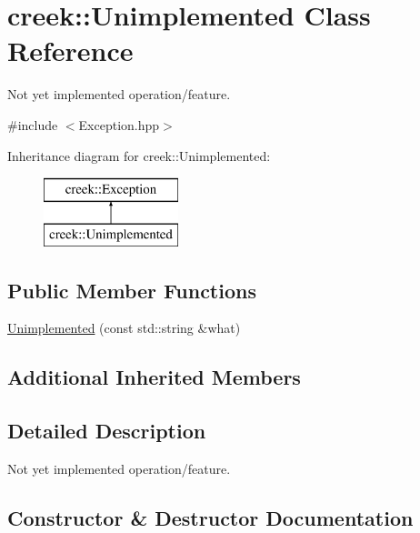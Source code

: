 \hypertarget{classcreek_1_1_unimplemented}{}\section{creek\+:\+:Unimplemented Class Reference}
\label{classcreek_1_1_unimplemented}


Not yet implemented operation/feature.  




{\ttfamily \#include $<$Exception.\+hpp$>$}

Inheritance diagram for creek\+:\+:Unimplemented\+:\begin{figure}[H]
\begin{center}
\leavevmode
\includegraphics[height=2.000000cm]{classcreek_1_1_unimplemented}
\end{center}
\end{figure}
\subsection*{Public Member Functions}
\begin{DoxyCompactItemize}
\item 
\hyperlink{classcreek_1_1_unimplemented_a54f070b44848103e91f453db039ee76f}{Unimplemented} (const std\+::string \&what)
\end{DoxyCompactItemize}
\subsection*{Additional Inherited Members}


\subsection{Detailed Description}
Not yet implemented operation/feature. 

\subsection{Constructor \& Destructor Documentation}
